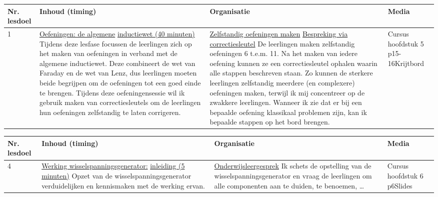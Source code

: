 \begin{landscape}
	\begin{tabularx}{1.56\textwidth}{|p{1.5cm}|p{8cm}|X|p{4cm}|}
		\hline
		\textbf{Nr. lesdoel } & \textbf{Inhoud (timing)}  & \textbf{Organisatie } & \textbf{Media } \\ \hline
		1\newline\newline2\newline\newline3	&\underline{Oefeningen: de algemene} \underline{inductiewet (40 minuten)}\newline
			Tijdens deze lesfase focussen de leerlingen zich op het maken van oefeningen in verband met de algemene inductiewet. Deze combineert de wet van Faraday en de wet van Lenz, dus leerlingen moeten beide begrijpen om de oefeningen tot een goed einde te brengen. Tijdens deze oefeningensessie wil ik gebruik maken van correctiesleutels om de leerlingen hun oefeningen zelfstandig te laten corrigeren.
		&  \underline{Zelfstandig oefeningen maken} \underline{Bespreking via correctiesleutel}\newline 
			De leerlingen maken zelfstandig oefeningen 6 t.e.m. 11. Na het maken van iedere oefening kunnen ze een correctiesleutel ophalen waarin alle stappen beschreven staan. Zo kunnen de sterkere leerlingen zelfstandig meerdere (en complexere) oefeningen maken, terwijl ik mij concentreer op de zwakkere leerlingen. Wanneer ik zie dat er bij een bepaalde oefening klassikaal problemen zijn, kan ik bepaalde stappen op het bord brengen.
		&   Cursus hoofdstuk 5 p15-16\newline\newline Krijtbord
		\\ \hline
	\end{tabularx}\vspace{5mm}



\begin{tabularx}{1.56\textwidth}{|p{1.5cm}|p{8cm}|X|p{4cm}|}
	\hline
	\textbf{Nr. lesdoel } & \textbf{Inhoud (timing)}  & \textbf{Organisatie } & \textbf{Media } \\ \hline
    4 & \underline{Werking wisselspanningsgenerator:} \underline{inleiding (5 minuten)}\newline
    	Opzet van de wisselspanningsgenerator verduidelijken en kennismaken met de werking ervan.
	&  \underline{Onderwijsleergesprek}\newline 
	Ik schets de opstelling van de wisselspanningsgenerator en vraag de leerlingen om alle componenten aan te duiden, te benoemen, \ldots 
	&  Cursus hoofdstuk 6 p6\newline\newline Slides
	\\ \hline
\end{tabularx}\vspace{5mm}



\end{landscape}
